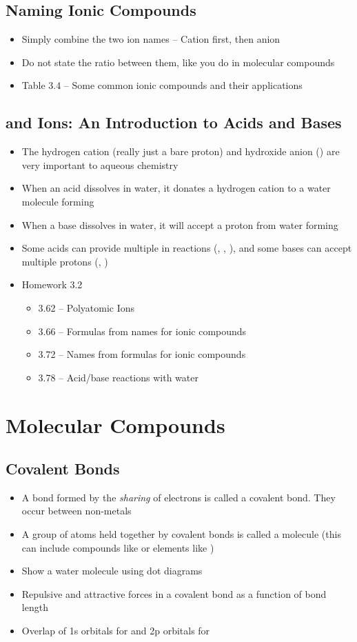\documentclass[12pt, openany, letterpaper]{memoir}
\begin{document}
\section{Naming Ionic Compounds}
\begin{itemize}
	\item Simply combine the two ion names -- Cation first, then anion
	\item Do not state the ratio between them, like you do in molecular compounds
	\item Table 3.4 -- Some common ionic compounds and their applications
\end{itemize}

\section{ and  Ions: An Introduction to Acids and Bases}
\begin{itemize}
	\item The hydrogen cation (really just a bare proton) and hydroxide anion () are very important to aqueous chemistry
	\item When an acid dissolves in water, it donates a hydrogen cation to a water molecule forming 
	\item When a base dissolves in water, it will accept a proton from water forming 
	\item Some acids can provide multiple  in reactions (, , ), and some bases can accept multiple protons (, )
	\item Homework 3.2
	\begin{itemize}		
		\item 3.62 -- Polyatomic Ions
		\item 3.66 -- Formulas from names for ionic compounds
		\item 3.72 -- Names from formulas for ionic compounds
		\item 3.78 -- Acid/base reactions with water
	\end{itemize}
\end{itemize}

\chapter{Molecular Compounds}
\section{Covalent Bonds}
\begin{itemize}
	\item A bond formed by the \emph{sharing} of electrons is called a covalent bond. They occur between non-metals
	\item A group of atoms held together by covalent bonds is called a molecule (this can include compounds like  or elements like )
	\item Show a water molecule using dot diagrams
	\item Repulsive and attractive forces in a covalent bond as a function of bond length
	\item Overlap of 1s orbitals for  and 2p orbitals for 	
\end{itemize}
\end{document}
